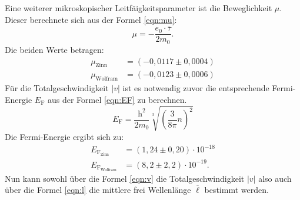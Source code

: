 Eine weiterer mikroskopischer Leitfäigkeitsparameter ist die Beweglichkeit $\mu$.
Dieser berechnete sich aus der Formel \eqref{eqn:mu}:
\begin{equation}
\mu=-\frac{e_0\cdot\overline{\tau}}{2m_0}\label{eqn:mu}.
\end{equation}
Die beiden Werte betragen:
\begin{align*}
\mu_\mathrm{Zinn}&=(-0,0117\pm0,0004)\si{}\\
\mu_\mathrm{Wolfram}&=(-0,0123\pm0,0006)\si{}
\end{align*}
Für die Totalgeschwindigkeit $|v|$ ist es notwendig zuvor die entsprechende Fermi-Energie
$E_\mathrm{F}$ aus der Formel \eqref{eqn:EF} zu berechnen.
\begin{equation}
E_\mathrm{F}=\frac{\mathrm{h}^2}{2m_0}\sqrt[3]{\left(\frac{3}{8\pi}n\right)^2}\label{eqn:EF}
\end{equation}
Die Fermi-Energie ergibt sich zu:
\begin{align*}
E_\mathrm{F_\mathrm{Zinn}}&=(1,24\pm0,20)\cdot10^{-18}\si{}\\
E_\mathrm{F_\mathrm{Wolfram}}&=(8,2\pm2,2)\cdot10^{-19}\si{}.
\end{align*}
Nun  kann sowohl über die Formel \ref{eqn:v} die Totalgeschwindigkeit $|v|$ also auch
über die Formel \ref{eqn:l} die mittlere frei Wellenlänge  $\overline{\ell}$ bestimmt werden.
